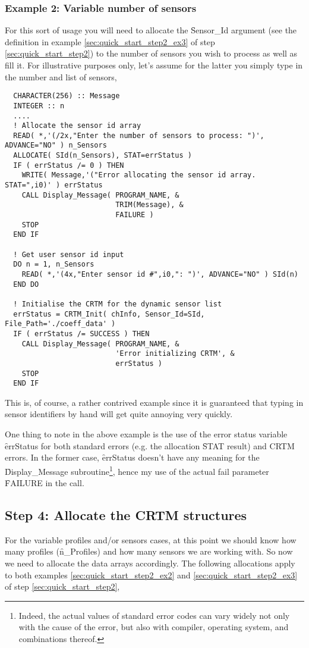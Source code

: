 \subsubsection{Example 2: Variable number of sensors}
For this sort of usage you will need to allocate the \f{Sensor\_Id} argument (see the definition in example \ref{sec:quick_start_step2_ex3} of step \ref{sec:quick_start_step2}) to the number of sensors you wish to process as well as fill it. For illustrative purposes only, let's assume for the latter you simply type in the number and list of sensors,
\begin{ttfamily}
  \begin{verbatim}
  CHARACTER(256) :: Message
  INTEGER :: n
  ....
  ! Allocate the sensor id array
  READ( *,'(/2x,"Enter the number of sensors to process: ")', ADVANCE="NO" ) n_Sensors
  ALLOCATE( SId(n_Sensors), STAT=errStatus )
  IF ( errStatus /= 0 ) THEN
    WRITE( Message,'("Error allocating the sensor id array. STAT=",i0)' ) errStatus
    CALL Display_Message( PROGRAM_NAME, &
                          TRIM(Message), & 
                          FAILURE )
    STOP
  END IF
  
  ! Get user sensor id input
  DO n = 1, n_Sensors
    READ( *,'(4x,"Enter sensor id #",i0,": ")', ADVANCE="NO" ) SId(n)
  END DO
  
  ! Initialise the CRTM for the dynamic sensor list
  errStatus = CRTM_Init( chInfo, Sensor_Id=SId, File_Path='./coeff_data' )
  IF ( errStatus /= SUCCESS ) THEN 
    CALL Display_Message( PROGRAM_NAME, &
                          'Error initializing CRTM', & 
                          errStatus )
    STOP
  END IF\end{verbatim}
\end{ttfamily}
This is, of course, a rather contrived example since it is guaranteed that typing in sensor identifiers by hand will get quite annoying very quickly.

One thing to note in the above example is the use of the error status variable \f{errStatus} for both standard errors (e.g. the allocation \f{STAT} result) and CRTM errors. In the former case, \f{errStatus} doesn't have any meaning for the \f{Display\_Message} subroutine\footnote{Indeed, the actual values of standard error codes can vary widely not only with the cause of the error, but also with compiler, operating system, and combinations thereof.}, hence my use of the actual fail parameter \f{FAILURE} in the call.


\subsection{Step 4: Allocate the CRTM structures}
For the variable profiles and/or sensors cases, at this point we should know how many profiles (\f{n\_Profiles}) and how many sensors we are working with. So now we need to allocate the data arrays accordingly. The following allocations apply to both examples \ref{sec:quick_start_step2_ex2} and \ref{sec:quick_start_step2_ex3} of step \ref{sec:quick_start_step2},

